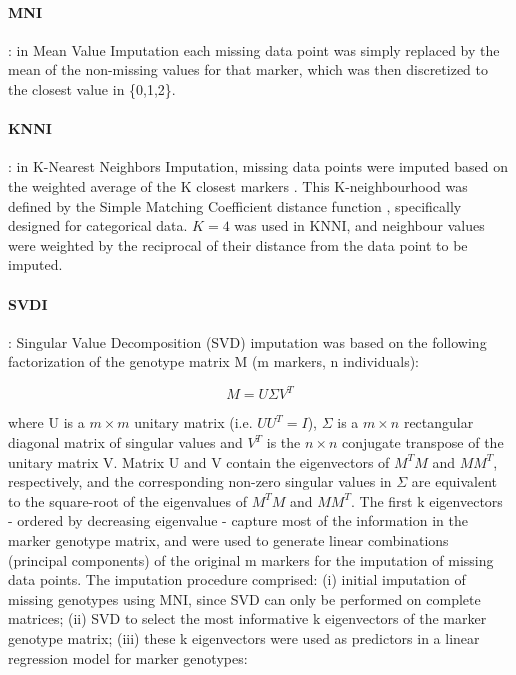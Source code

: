 \paragraph{MNI}
\label{par:MNI}
: in Mean Value Imputation each missing data point was simply replaced by the mean of the non-missing values for that marker, which was then discretized to the closest value in \{0,1,2\}. 
\paragraph{KNNI}
\label{par:KNNI}
: in K-Nearest Neighbors Imputation, missing data points were imputed based on the weighted average of the K closest markers \cite{troyanskaya_missing_2001}. This K-neighbourhood was defined by the Simple Matching Coefficient distance function \cite{schwender_statistical_2007}, specifically designed for categorical data. $K=4$ was used in KNNI, and neighbour values were weighted by the reciprocal of their distance from the data point to be imputed.
\paragraph{SVDI}
\label{par:SVDI}
: Singular Value Decomposition (SVD) imputation was based on the following factorization of the genotype matrix M (m markers, n individuals):

\begin{equation}
\label{eq:SVDI_general}
M = U\Sigma V^{T}
\end{equation}

where U is a $m \times m$ unitary matrix (i.e. $UU^{T}=I$), $\Sigma$ is a $m \times n$ rectangular diagonal matrix of singular values and $V^{T}$ is the $n \times n$ conjugate transpose of the unitary matrix V. Matrix U and V contain the eigenvectors of $M^{T}M$ and $MM^{T}$, respectively, and the corresponding non-zero singular values in $\Sigma$ are equivalent to the square-root of the eigenvalues of $M^{T}M$ and $MM^{T}$. The first k eigenvectors - ordered by decreasing eigenvalue - capture most of the information in the marker genotype matrix, and were used to generate linear combinations (principal components) of the original m markers for the imputation of missing data points. The imputation procedure comprised: (i) initial imputation of missing genotypes using MNI, since SVD can only be performed on complete matrices; (ii) SVD to select the most informative k eigenvectors of the marker genotype matrix; (iii) these k eigenvectors were used as predictors in a linear regression model for marker genotypes:

